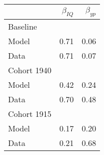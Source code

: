 \begin{tabular}{lrr}
\hline
  & $\beta_{IQ}$  & $\beta_{yp}$  \\ 
\hline
Baseline &   &   \\ 
Model & 0.71  & 0.06  \\ 
Data & 0.71  & 0.07  \\ 
Cohort 1940 &   &   \\ 
Model & 0.42  & 0.24  \\ 
Data & 0.70  & 0.48  \\ 
Cohort 1915 &   &   \\ 
Model & 0.17  & 0.20  \\ 
Data & 0.21  & 0.68  \\ 
\hline
\end{tabular}%
